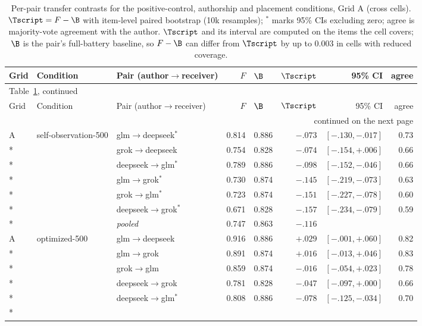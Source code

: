 {\scriptsize\renewcommand{\arraystretch}{0.9}
\begin{longtable}{lllrlrrr}
\caption{Per-pair transfer contrasts for the positive-control, authorship and placement conditions, Grid A (cross cells). $\Tscript = F - \B$ with item-level paired bootstrap (10k resamples); $^{*}$ marks 95\% CIs excluding zero; agree is majority-vote agreement with the author. $\Tscript$ and its interval are computed on the items the cell covers; $\B$ is the pair's full-battery baseline, so $F - \B$ can differ from $\Tscript$ by up to $0.003$ in cells with reduced coverage.}\label{tab:added-pairs} \\
\toprule
Grid & Condition & Pair (author$\to$receiver) & $F$ & $\B$ & $\Tscript$ & 95\% CI & agree \\
\midrule
\endfirsthead
\multicolumn{8}{l}{\footnotesize Table~\ref{tab:added-pairs}, continued} \\
\toprule
Grid & Condition & Pair (author$\to$receiver) & $F$ & $\B$ & $\Tscript$ & 95\% CI & agree \\
\midrule
\endhead
\midrule
\multicolumn{8}{r}{\footnotesize continued on the next page} \\
\endfoot
\bottomrule
\endlastfoot
A & self-observation-500 & glm$\to$deepseek$^{*}$ & 0.814 & 0.886 & $-.073$ & $[-.130,-.017]$ & 0.73 \\*
 &  & grok$\to$deepseek & 0.754 & 0.828 & $-.074$ & $[-.154,+.006]$ & 0.66 \\*
 &  & deepseek$\to$glm$^{*}$ & 0.789 & 0.886 & $-.098$ & $[-.152,-.046]$ & 0.66 \\*
 &  & glm$\to$grok$^{*}$ & 0.730 & 0.874 & $-.145$ & $[-.219,-.073]$ & 0.63 \\*
 &  & grok$\to$glm$^{*}$ & 0.723 & 0.874 & $-.151$ & $[-.227,-.078]$ & 0.60 \\*
 &  & deepseek$\to$grok$^{*}$ & 0.671 & 0.828 & $-.157$ & $[-.234,-.079]$ & 0.59 \\*
 & & \emph{pooled} & 0.747 & 0.863 & $-.116$ & & \\
\addlinespace
A & optimized-500 & glm$\to$deepseek & 0.916 & 0.886 & $+.029$ & $[-.001,+.060]$ & 0.82 \\*
 &  & glm$\to$grok & 0.891 & 0.874 & $+.016$ & $[-.013,+.046]$ & 0.83 \\*
 &  & grok$\to$glm & 0.859 & 0.874 & $-.016$ & $[-.054,+.023]$ & 0.78 \\*
 &  & deepseek$\to$grok & 0.781 & 0.828 & $-.047$ & $[-.097,+.000]$ & 0.66 \\*
 &  & deepseek$\to$glm$^{*}$ & 0.808 & 0.886 & $-.078$ & $[-.125,-.034]$ & 0.70 \\*

\end{longtable}}
